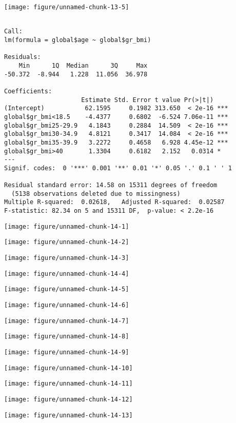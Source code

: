 \documentclass[11pt,a4paper]{article}\usepackage[]{graphicx}\usepackage[]{color}
\makeatletter
\def\maxwidth{ %
  \ifdim\Gin@nat@width>\linewidth
    \linewidth
  \else
    \Gin@nat@width
  \fi
}
\newenvironment{kframe}{%
 \def\at@end@of@kframe{}%
 \ifinner\ifhmode%
  \def\at@end@of@kframe{\end{minipage}}%
  \begin{minipage}{\columnwidth}%
 \fi\fi%
 \def\FrameCommand##1{\hskip\@totalleftmargin \hskip-\fboxsep
 \colorbox{shadecolor}{##1}\hskip-\fboxsep
     \hskip-\linewidth \hskip-\@totalleftmargin \hskip\columnwidth}%
 \MakeFramed {\advance\hsize-\width
   \@totalleftmargin\z@ \linewidth\hsize
   \@setminipage}}%
 {\par\unskip\endMakeFramed%
 \at@end@of@kframe}
\newenvironment{knitrout}{}{} %
\makeatother
\begin{document}
\begin{knitrout}
\texttt{[image: figure/unnamed-chunk-13-5]} 
\begin{kframe}\begin{verbatim}

Call:
lm(formula = global$age ~ global$gr_bmi)

Residuals:
    Min      1Q  Median      3Q     Max 
-50.372  -8.944   1.228  11.056  36.978 

Coefficients:
                     Estimate Std. Error t value Pr(>|t|)    
(Intercept)           62.1595     0.1982 313.650  < 2e-16 ***
global$gr_bmi<18.5    -4.4377     0.6802  -6.524 7.06e-11 ***
global$gr_bmi25-29.9   4.1843     0.2884  14.509  < 2e-16 ***
global$gr_bmi30-34.9   4.8121     0.3417  14.084  < 2e-16 ***
global$gr_bmi35-39.9   3.2272     0.4658   6.928 4.45e-12 ***
global$gr_bmi>40       1.3304     0.6182   2.152   0.0314 *  
---
Signif. codes:  0 '***' 0.001 '**' 0.01 '*' 0.05 '.' 0.1 ' ' 1

Residual standard error: 14.58 on 15311 degrees of freedom
  (5138 observations deleted due to missingness)
Multiple R-squared:  0.02618,	Adjusted R-squared:  0.02587 
F-statistic: 82.34 on 5 and 15311 DF,  p-value: < 2.2e-16
\end{verbatim}
\end{kframe}
\end{knitrout}

\begin{knitrout}
\color{fgcolor}
\texttt{[image: figure/unnamed-chunk-14-1]} 

\texttt{[image: figure/unnamed-chunk-14-2]} 

\texttt{[image: figure/unnamed-chunk-14-3]} 

\texttt{[image: figure/unnamed-chunk-14-4]} 

\texttt{[image: figure/unnamed-chunk-14-5]} 

\texttt{[image: figure/unnamed-chunk-14-6]} 

\texttt{[image: figure/unnamed-chunk-14-7]} 

\texttt{[image: figure/unnamed-chunk-14-8]} 

\texttt{[image: figure/unnamed-chunk-14-9]} 

\texttt{[image: figure/unnamed-chunk-14-10]} 

\texttt{[image: figure/unnamed-chunk-14-11]} 

\texttt{[image: figure/unnamed-chunk-14-12]} 

\texttt{[image: figure/unnamed-chunk-14-13]} 

\end{knitrout}
\end{document}
